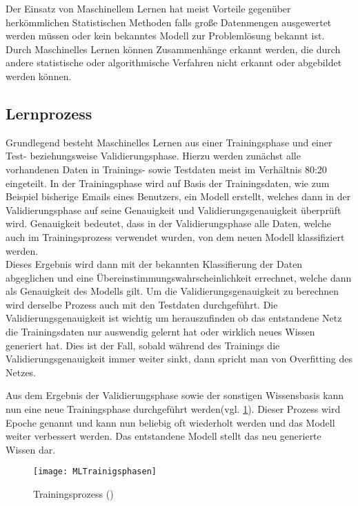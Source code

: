     Der Einsatz von Maschinellem Lernen hat meist Vorteile gegenüber herkömmlichen Statistischen Methoden falls große Datenmengen ausgewertet werden müssen
    oder kein bekanntes Modell zur Problemlösung bekannt ist.
    Durch Maschinelles Lernen können Zusammenhänge erkannt werden, die durch andere statistische oder algorithmische Verfahren nicht erkannt oder abgebildet werden können.

    \subsection{Lernprozess} \label{Lernprozess}
    Grundlegend besteht Maschinelles Lernen aus einer Trainingsphase und einer Test- beziehungsweise Validierungsphase.
    Hierzu werden zunächst alle vorhandenen Daten in Trainings- sowie Testdaten meist im Verhältnis 80:20 eingeteilt.
    In der Trainingsphase wird auf Basis der Trainingsdaten, wie zum Beispiel bisherige Emails eines Benutzers, ein Modell erstellt, welches dann in der Validierungsphase auf seine Genauigkeit und Validierungsgenauigkeit überprüft wird.
    Genauigkeit bedeutet, dass in der Validierungsphase alle Daten, welche auch im Trainingsprozess verwendet wurden, von dem neuen Modell klassifiziert werden.\\
    Dieses Ergebnis wird dann mit der bekannten Klassifierung der Daten abgeglichen und eine Übereinstimmungswahrscheinlichkeit errechnet, welche dann als Genauigkeit des Modells gilt.
    Um die Validierungsgenauigkeit zu berechnen wird derselbe Prozess auch mit den Testdaten durchgeführt.
    Die Validierungsgenauigkeit ist wichtig um herauszufinden ob das entstandene Netz die Trainingsdaten nur auswendig gelernt hat oder wirklich neues Wissen generiert hat.
    Dies ist der Fall, sobald während des Trainings die Validierungsgenauigkeit immer weiter sinkt, dann spricht man von Overfitting des Netzes.
    \newline

    \noindent
    Aus dem Ergebnis der Validierungsphase sowie der sonstigen Wissensbasis kann nun eine neue Trainingsphase durchgeführt werden(vgl. \ref{fig:MLTrainigsprozess}).
    Dieser Prozess wird Epoche genannt und kann nun beliebig oft wiederholt werden und das Modell weiter verbessert werden.
    Das entstandene Modell stellt das neu generierte Wissen dar.

    \begin{figure}[H]
        \centering
        \texttt{[image: MLTrainigsphasen]}
        \caption{Trainingsprozess (\cite[Figure 1-2]{HandsOnML})}
        \label{fig:MLTrainigsprozess}
    \end{figure}


